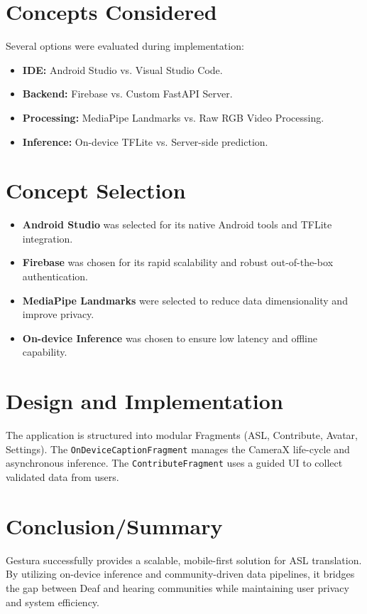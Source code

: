 \documentclass[12pt,a4paper]{article}
\begin{document}
\section{Concepts Considered}
Several options were evaluated during implementation:
\begin{itemize}
    \item \textbf{IDE:} Android Studio vs. Visual Studio Code.
    \item \textbf{Backend:} Firebase vs. Custom FastAPI Server.
    \item \textbf{Processing:} MediaPipe Landmarks vs. Raw RGB Video Processing.
    \item \textbf{Inference:} On-device TFLite vs. Server-side prediction.
\end{itemize}

\section{Concept Selection}
\begin{itemize}
    \item \textbf{Android Studio} was selected for its native Android tools and TFLite integration.
    \item \textbf{Firebase} was chosen for its rapid scalability and robust out-of-the-box authentication.
    \item \textbf{MediaPipe Landmarks} were selected to reduce data dimensionality and improve privacy.
    \item \textbf{On-device Inference} was chosen to ensure low latency and offline capability.
\end{itemize}

\section{Design and Implementation}
The application is structured into modular Fragments (ASL, Contribute, Avatar, Settings).
The \texttt{OnDeviceCaptionFragment} manages the CameraX life-cycle and asynchronous inference. The \texttt{ContributeFragment} uses a guided UI to collect validated data from users.

\section{Conclusion/Summary}
Gestura successfully provides a scalable, mobile-first solution for ASL translation. By utilizing on-device inference and community-driven data pipelines, it bridges the gap between Deaf and hearing communities while maintaining user privacy and system efficiency.
\end{document}
